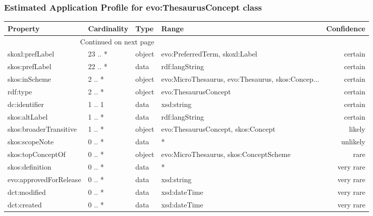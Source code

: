 \documentclass[10pt,a4paper,titlepage,final]{article}
\begin{document}
\subsubsection{Estimated Application Profile for evo:ThesaurusConcept class}
\begin{tabularx}{\textwidth}{lllXr}
\toprule
               Property & Cardinality &    Type &                                              Range & Confidence \\
\midrule
\endhead
\midrule
\multicolumn{3}{r}{{Continued on next page}} \\
\midrule
\endfoot

\bottomrule
\endlastfoot
        skoxl:prefLabel &     23 .. * &  object &                     evo:PreferredTerm, skoxl:Label &    certain \\
         skos:prefLabel &     22 .. * &    data &                                     rdf:langString &    certain \\
          skos:inScheme &      2 .. * &  object &  evo:MicroThesaurus, evo:Thesaurus, skos:Concep... &    certain \\
               rdf:type &      2 .. * &  object &                               evo:ThesaurusConcept &    certain \\
          dc:identifier &      1 .. 1 &    data &                                         xsd:string &    certain \\
          skos:altLabel &      1 .. * &    data &                                     rdf:langString &    certain \\
 skos:broaderTransitive &      1 .. * &  object &                 evo:ThesaurusConcept, skos:Concept &     likely \\
         skos:scopeNote &      0 .. * &    data &                                                  * &   unlikely \\
      skos:topConceptOf &      0 .. * &  object &             evo:MicroThesaurus, skos:ConceptScheme &       rare \\
        skos:definition &      0 .. * &    data &                                                  * &  very rare \\
 evo:approvedForRelease &      0 .. * &    data &                                         xsd:string &  very rare \\
           dct:modified &      0 .. * &    data &                                       xsd:dateTime &  very rare \\
            dct:created &      0 .. * &    data &                                       xsd:dateTime &  very rare \\

\end{tabularx}
\end{document}

